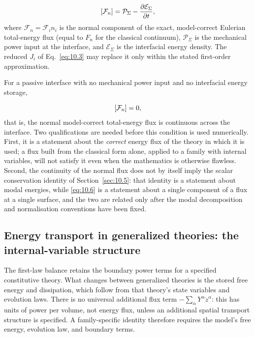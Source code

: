 \begin{equation}
\left[ \mathcal{F}_n \right] = \mathcal{P}_\Sigma - \frac{\partial\mathcal{E}_\Sigma}{\partial t},
\label{eq:10.5}
\end{equation}
where $\mathcal{F}_n=\mathcal{F}_i n_i$ is the normal component of the exact, model-correct Eulerian total-energy flux (equal to $F_n$ for the classical continuum), $\mathcal{P}_\Sigma$ is the mechanical power input at the interface, and $\mathcal{E}_\Sigma$ is the interfacial energy density. The reduced $J_i$ of Eq.~\eqref{eq:10.3} may replace it only within the stated first-order approximation.

For a passive interface with no mechanical power input and no interfacial energy storage,

\begin{equation}
\left[ \mathcal{F}_n \right] = 0,
\label{eq:10.6}
\end{equation}
that is, the normal model-correct total-energy flux is continuous across the interface. Two qualifications are needed before this condition is used numerically. First, it is a statement about the \emph{correct} energy flux of the theory in which it is used; a flux built from the classical form alone, applied to a family with internal variables, will not satisfy it even when the mathematics is otherwise flawless. Second, the continuity of the normal flux does not by itself imply the scalar conservation identity of Section~\ref{sec:10.5}: that identity is a statement about modal energies, while \eqref{eq:10.6} is a statement about a single component of a flux at a single surface, and the two are related only after the modal decomposition and normalisation conventions have been fixed.

\subsection{Energy transport in generalized theories: the internal-variable structure}
\label{sec:10.4}

The first-law balance retains the boundary power terms for a specified constitutive theory. What changes between generalized theories is the stored free energy and dissipation, which follow from that theory's state variables and evolution laws. There is no universal additional flux term $-\sum_\alpha Y^\alpha\dot z^\alpha$: this has units of power per volume, not energy flux, unless an additional spatial transport structure is specified. A family-specific identity therefore requires the model's free energy, evolution law, and boundary terms.

